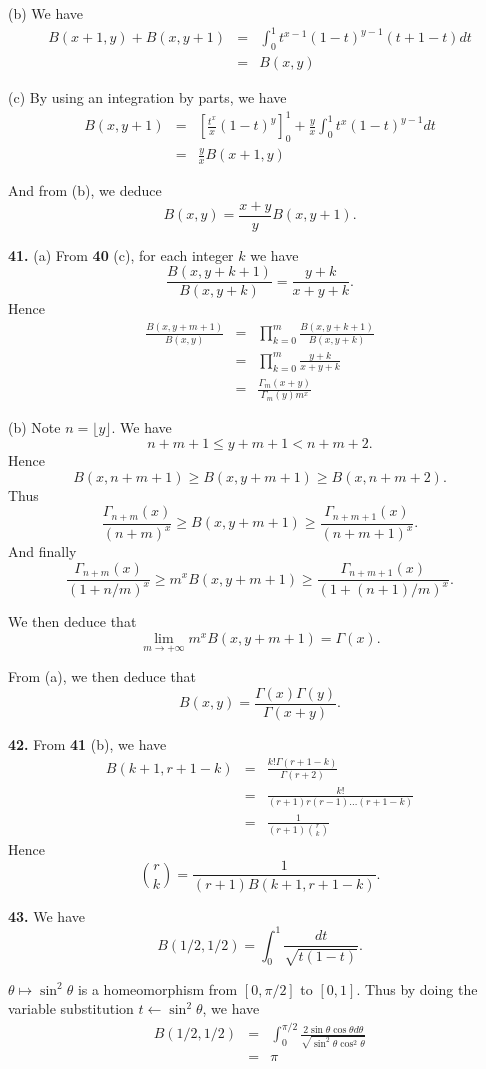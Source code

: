 \documentclass[a4paper,12pt]{article}
\newcommand{\newpar}[1]{\bigskip \noindent \textbf{#1.}}
\newcommand{\subpar}[1]{\medskip \noindent (#1)}
\newcommand{\la}{\leftarrow}
\begin{document}
\subpar{b} We have
\begin{eqnarray*}
  B(x+1, y) + B(x, y+1) &=& \int_0^1 t^{x-1}(1-t)^{y-1}(t + 1 - t)
  dt\\
  &=& B(x, y)
\end{eqnarray*}

\subpar{c} By using an integration by parts, we have
\begin{eqnarray*}
  B(x, y+1) &=& \left[ \frac{t^x}{x}(1-t)^y \right]_0^1 +
  \frac{y}{x}\int_0^1 t^x (1-t)^{y-1} dt \\
  &=& \frac{y}{x} B(x+1, y)
\end{eqnarray*}

And from (b), we deduce
\[ B(x, y) = \frac{x+y}{y} B(x, y+1).\]

\newpar{41} \subpar{a} From \textbf{40} (c), for each integer $k$ we have
\[ \frac{B(x, y + k + 1)}{B(x, y+k)} = \frac{y + k}{x+y+k}.\]
Hence
\begin{eqnarray*}
  \frac{B(x, y+m+1)}{B(x, y)} &=& \prod_{k=0}^m \frac{B(x,
    y+k+1)}{B(x, y+k)} \\
  &=& \prod_{k=0}^m \frac{y+k}{x+y+k} \\
  &=& \frac{\Gamma_m(x+y)}{\Gamma_m(y)m^x}
\end{eqnarray*}

\subpar{b} Note $n = \lfloor y\rfloor$.  We have
\[ n + m + 1 \le y + m + 1 < n+m+2.\]
Hence
\[ B(x, n+m+1) \ge B(x, y+m+1) \ge B(x, n+m+2).\]
Thus
\[ \frac{\Gamma_{n+m}(x)}{(n+m)^x} \ge B(x, y+m+1) \ge
\frac{\Gamma_{n+m+1}(x)}{(n+m+1)^x}.\]
And finally
\[ \frac{\Gamma_{n+m}(x)}{(1+n/m)^x} \ge m^x B(x, y+m+1) \ge
\frac{\Gamma_{n+m+1}(x)}{(1+(n+1)/m)^x}.\]

We then deduce that
\[ \lim_{m \to +\infty} m^x B(x, y+m+1) = \Gamma(x).\]

From (a), we then deduce that
\[ B(x, y) = \frac{\Gamma(x) \Gamma(y)}{\Gamma(x+y)}.\]

\newpar{42}  From \textbf{41} (b), we have
\begin{eqnarray*}
  B(k+1, r+1-k) &=& \frac{k!\Gamma(r+1-k)}{\Gamma(r+2)} \\
  &=& \frac{k!}{(r+1)r(r-1) \ldots (r+1-k)} \\
  &=& \frac{1}{(r+1){r \choose k}}
\end{eqnarray*}
Hence
\[ {r \choose k} = \frac{1}{(r+1)B(k+1, r+1-k)}.\]

\newpar{43} We have
\[ B(1/2, 1/2) = \int_0^1 \frac{dt}{\sqrt{t(1-t)}}.\]

$\theta \mapsto \sin^2\theta$ is a homeomorphism from $[0, \pi/2]$ to
$[0, 1]$. Thus by doing the variable substitution $t \la
\sin^2\theta$, we have
\begin{eqnarray*}
  B(1/2, 1/2) &=& \int_0^{\pi/2} \frac{2 \sin\theta \cos\theta
    d\theta}{\sqrt{\sin^2\theta \cos^2\theta}} \\
  &=& \pi
\end{eqnarray*}
\end{document}
